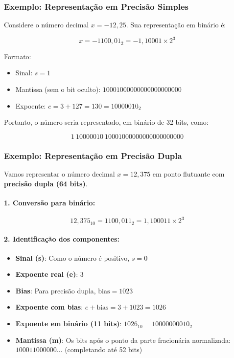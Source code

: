 \subsubsection*{Exemplo: Representação em \textbf{Precisão Simples}}

Considere o número decimal \( x = -12{,}25 \). Sua representação em binário é:

\[
x = -1100{,}01_2 = -1{,}10001 \times 2^3
\]

Formato:

\begin{itemize}
  \item Sinal: \( s = 1 \)
  \item Mantissa (sem o bit oculto): \( 10001000000000000000000 \)
  \item Expoente: \( e = 3 + 127 = 130 = 10000010_2 \)
\end{itemize}

Portanto, o número seria representado, em binário de 32 bits, como:

\[
\boxed{1\ 10000010\ 10001000000000000000000}
\]
\subsubsection*{Exemplo: Representação em Precisão Dupla}

Vamos representar o número decimal \( x = 12{,}375 \) em ponto flutuante com \textbf{precisão dupla (64 bits)}.

\paragraph{1. Conversão para binário:}

\[
12{,}375_{10} = 1100{,}011_2 = 1{,}100011 \times 2^3
\]

\paragraph{2. Identificação dos componentes:}

\begin{itemize}
  \item \textbf{Sinal (s)}: Como o número é positivo, \( s = 0 \)
  \item \textbf{Expoente real (e)}: \( 3 \)
  \item \textbf{Bias}: Para precisão dupla, \( \text{bias} = 1023 \)
  \item \textbf{Expoente com bias}: \( e + \text{bias} = 3 + 1023 = 1026 \)
  \item \textbf{Expoente em binário (11 bits)}: \( 1026_{10} = 10000000010_2 \)
  \item \textbf{Mantissa (m)}: Os bits após o ponto da parte fracionária normalizada: \( 100011000000\ldots \) (completando até 52 bits)
\end{itemize}

